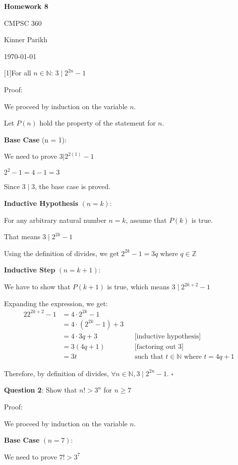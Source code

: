 \documentclass{article} %
\newcommand{\question}[2][]{\begin{flushleft}
        \textbf{Question #1}: #2

\end{flushleft}}
\newcommand{\maketitletwo}[2][]{\begin{center}
        \Large{\textbf{Homework #1}
            
            CMPSC 360} %
        \vspace{5pt}
        
        \normalsize{Kinner Parikh  %
        
        \today}        %
        \vspace{15pt}
        
\end{center}}
\begin{document}
    \maketitletwo[8]  %
    
    \question[1]{For all $n \in \mathbb{N}$: $3 \mid 2^{2n} - 1$}

    Proof:

    We proceed by induction on the variable $n$.
    
    Let $P(n)$ hold the property of the statement for $n$.

    \textbf{Base Case} (n = 1):

    We need to prove $3 | 2^{2(1)} - 1$

    $2 ^ 2 - 1 = 4 - 1 = 3$

    Since $3 \mid 3$, the base case is proved.

    \textbf{Inductive Hypothesis} $(n = k)$:

    For any arbitrary natural number $n = k$, assume that $P(k)$ is true.

    That means $3 \mid 2^{2k} - 1$

    Using the definition of divides, we get $2^{2k} - 1 = 3q$ where $q \in \mathbb{Z}$

    \textbf{Inductive Step} $(n = k + 1)$:

    We have to show that $P(k + 1)$ is true, which means $3 \mid 2^{2k + 2} - 1$

    Expanding the expression, we get:
    \begin{alignat*}{2}
        2^{2k + 2} - 1 &= 4 \cdot 2^{2k} - 1 \\
        &= 4 \cdot (2^{2k} - 1) + 3 \\
        &= 4 \cdot 3q + 3 && \text{[inductive hypothesis]}\\
        &= 3(4q + 1) && \text{[factoring out 3]}\\
        &= 3t && \text{such that $t \in \mathbb{N}$ where $t = 4q + 1$}
    \end{alignat*}

    Therefore, by definition of divides, $\forall n \in \mathbb{N}, 3 \mid 2^{2n} - 1$. $\square$

    \newpage

    \question[2]{Show that $n! > 3^n$ for $n \geq 7$}

    Proof: 

    We proceed by induction on the variable $n$.

    \textbf{Base Case} $(n = 7)$:

    We need to prove $7! > 3^7$
\end{document}
